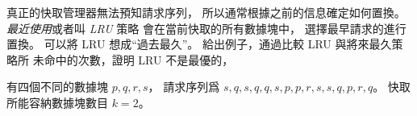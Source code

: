\startEXERCISE
真正的快取管理器無法預知請求序列，
所以通常根據之前的信息確定如何置換。
\emph{最近使用}或者叫 \emph{LRU} 策略
會在當前快取的所有數據塊中，
選擇最早請求的進行置換。
可以將 LRU 想成“過去最久”。
給出例子，通過比較 LRU 與將來最久策略所
未命中的次數，證明 LRU 不是最優的，
\stopEXERCISE

\startANSWER
有四個不同的數據塊 $p,q,r,s$，
請求序列爲 $s,q,s,q,q,s,p,p,r,s,s,q,p,r,q$。
快取所能容納數據塊數目 $k=2$。


\stopANSWER
